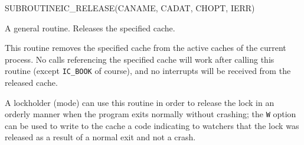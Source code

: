 \begin{routine} %
\subroutine
   {SUBROUTINE}{IC\_RELEASE}{(CANAME, CADAT, CHOPT, IERR)}
\begin{overview}
A general routine. Releases the specified cache.
\end{overview}
\begin{argdeflist}
\end{argdeflist}
\begin{describe}

This routine removes the specified cache from the active caches of
the current process. No calls referencing the specified cache will
work after calling this routine (except \verb|IC_BOOK| of course),
and no interrupts will be received from the released cache.

A lockholder (\watcher mode) can use this routine in order to release
the lock in an orderly manner when the program exits normally without
crashing; the {\tt W} option can be used to write to the cache a
code indicating to watchers that the lock was released as a result of a
normal exit and not a crash.

\end{describe}
\begin{options}
\end{options}
\begin{returncodes}
\end{returncodes}
\end{routine}


